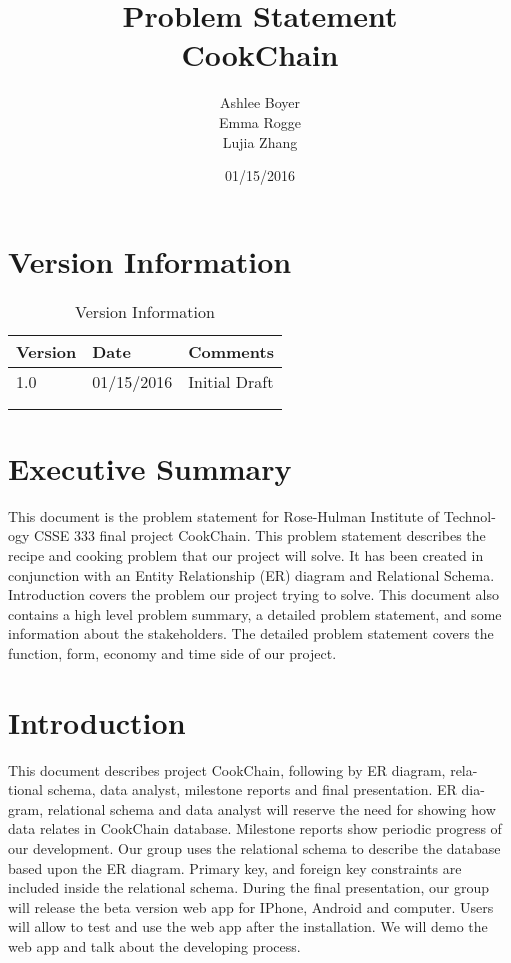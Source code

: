 \documentclass{article}
\title{\textbf{ Problem Statement  \\ CookChain}}
\author{Ashlee Boyer \\Emma Rogge \\ Lujia Zhang}
\date{01/15/2016}
\begin{document}
\maketitle
\renewcommand*\contentsname{Table of Contents} 
\newpage
\tableofcontents
\clearpage
\section{Version Information}
\begin{table}[h]
\centering

\caption*{Version Information}
\label{my-label}
\begin{tabular}{|l|l|l|}
\hline
Version & Date       & Comments      \\ \hline
1.0     & 01/15/2016 & Initial Draft \\ \hline
        &            &               \\ \hline
        &            &               \\ \hline
\end{tabular}
\end{table}
\section{Executive Summary}
This document is the problem statement for Rose-Hulman Institute of Technol- ogy CSSE 333 final project CookChain. This problem statement describes the recipe and cooking problem that our project will solve. It has been created in conjunction with an Entity Relationship (ER) diagram and Relational Schema. Introduction covers the problem our project trying to solve. This document also contains a high level problem summary, a detailed problem statement, and some information about the stakeholders. The detailed problem statement covers the function, form, economy and time side of our project.
\section{Introduction}
This document describes project CookChain, following by ER diagram, rela- tional schema, data analyst, milestone reports and final presentation. ER dia- gram, relational schema and data analyst will reserve the need for showing how data relates in CookChain database. Milestone reports show periodic progress of our development.
\newline
Our group uses the relational schema to describe the database based upon the ER diagram. Primary key, and foreign key constraints are included inside the relational schema.
\newline
During the final presentation, our group will release the beta version web app for IPhone, Android and computer. Users will allow to test and use the web app after the installation. We will demo the web app and talk about the developing process.
\end{document}
